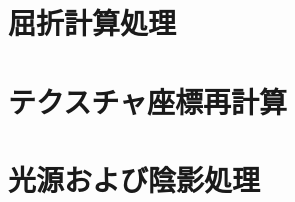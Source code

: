 \section{屈折計算処理}
\label{SRefraction}




\section{テクスチャ座標再計算}
\label{STexturerecalculation}

\section{光源および陰影処理}
\label{SPhongandshade}
